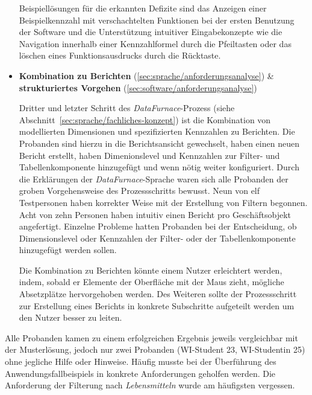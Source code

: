 \documentclass[
  language=german, %
  type=bachelor,%
  ngerman
]{isthesis}
\begin{document}
\begin{content}
\begin{itemize}
    Beispiellösungen für die erkannten Defizite sind das Anzeigen einer
    Beispielkennzahl mit verschachtelten Funktionen bei der ersten Benutzung
    der Software und die Unterstützung intuitiver Eingabekonzepte wie die
    Navigation innerhalb einer Kennzahlformel durch die Pfeiltasten oder
    das löschen eines Funktionsausdrucks durch die Rücktaste.

  \item \textbf{Kombination zu Berichten} (\ref{sec:sprache/anforderungsanalyse}) \& \textbf{strukturiertes Vorgehen} (\ref{sec:software/anforderungsanalyse})

    Dritter und letzter Schritt des \textit{DataFurnace}-Prozess (siehe
    Abschnitt~\ref{sec:sprache/fachliches-konzept}) ist die Kombination von
    modellierten Dimensionen und spezifizierten Kennzahlen zu Berichten. Die
    Probanden sind hierzu in die Berichtsansicht gewechselt, haben einen neuen
    Bericht erstellt, haben Dimenionslevel und Kennzahlen zur Filter- und
    Tabellenkomponente hinzugefügt und wenn nötig weiter konfiguriert. Durch
    die Erklärungen der \textit{DataFurnace}-Sprache waren sich alle Probanden
    der groben Vorgehensweise des Prozessschritts bewusst. Neun von elf
    Testpersonen haben korrekter Weise mit der Erstellung von Filtern begonnen.
    Acht von zehn Personen haben intuitiv einen Bericht pro Geschäftsobjekt
    angefertigt.  Einzelne Probleme hatten Probanden bei der Entscheidung, ob
    Dimensionslevel oder Kennzahlen der Filter- oder der Tabellenkomponente
    hinzugefügt werden sollen. 

    Die Kombination zu Berichten könnte einem Nutzer erleichtert werden, indem,
    sobald er Elemente der Oberfläche mit der Maus zieht, mögliche Absetzplätze
    hervorgehoben werden. Des Weiteren sollte der Prozessschritt zur Erstellung
    eines Berichts in konkrete Subschritte aufgeteilt werden um den Nutzer
    besser zu leiten.


\end{itemize}

Alle Probanden kamen zu einem erfolgreichen Ergebnis jeweils vergleichbar mit
der Musterlösung, jedoch nur zwei Probanden (WI-Student 23, WI-Studentin 25)
ohne jegliche Hilfe oder Hinweise. Häufig musste bei der Überführung des
Anwendungsfallbeispiels in konkrete Anforderungen geholfen werden. Die
Anforderung der Filterung nach \textit{Lebensmitteln} wurde am häufigsten
vergessen.




\end{content}
\end{document}
